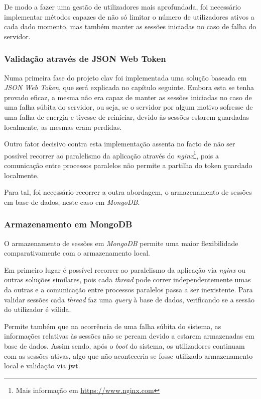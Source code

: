 De modo a fazer uma gestão de utilizadores mais aprofundada, foi necessário implementar métodos capazes de não só limitar o número de utilizadores ativos a cada dado momento, mas também manter as sessões iniciadas no caso de falha do servidor.

\subsubsection{Validação através de JSON Web Token}

Numa primeira fase do projeto \gls{clav} foi implementada uma solução baseada em \emph{JSON Web Token}, que será explicada no capítulo seguinte. Embora esta se tenha provado eficaz, a mesma não era capaz de manter as sessões iniciadas no caso de uma falha súbita do servidor, ou seja, se o servidor por algum motivo sofresse de uma falha de energia e tivesse de reiniciar, devido às sessões estarem guardadas localmente, as mesmas eram perdidas.

Outro fator decisivo contra esta implementação assenta no facto de não ser possível recorrer ao paralelismo da aplicação através do \emph{nginx}\footnote{Mais informação em \url{https://www.nginx.com}}, pois a comunicação entre processos paralelos não permite a partilha do token guardado localmente.

Para tal, foi necessário recorrer a outra abordagem, o armazenamento de sessões em base de dados, neste caso em \emph{MongoDB}.

\subsubsection{Armazenamento em MongoDB}

O armazenamento de sessões em \emph{MongoDB} permite uma maior flexibilidade comparativamente com o armazenamento local.

Em primeiro lugar é possível recorrer ao paralelismo da aplicação via \emph{nginx} ou outras soluções similares, pois cada \emph{thread} pode correr independentemente umas da outras e a comunicação entre processos paralelos passa a ser inexistente. Para validar sessões cada \emph{thread} faz uma \emph{query} à base de dados, verificando se a sessão do utilizador é válida.

Permite também que na ocorrência de uma falha súbita do sistema, as informações relativas às sessões não se percam devido a estarem armazenadas em base de dados. Assim sendo, após o \emph{boot} do sistema, os utilizadores continuam com as sessões ativas, algo que não aconteceria se fosse utilizado armazenamento local e validação via \gls{jwt}.

